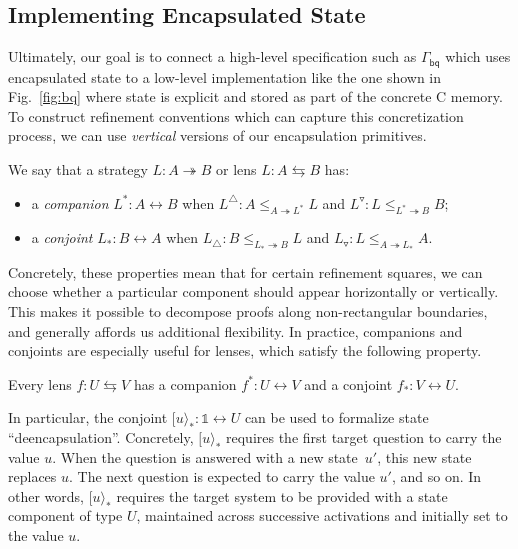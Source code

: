 \documentclass[acmsmall,nonacm]{acmart}
\newcommand{\kw}[1]{\ensuremath{ \mathsf{#1} }}
\newcommand{\lensarrow}{\leftrightarrows}
\newcommand{\mathbbm}[1]{\mathds{#1}}
\begin{document}

\subsection{Implementing Encapsulated State} %

Ultimately, our goal
is to connect a high-level specification such as $\Gamma_\kw{bq}$
which uses encapsulated state
to a low-level implementation like the one shown in Fig.~\ref{fig:bq}
where state is explicit and stored as part of the concrete C memory.
To construct refinement conventions
which can capture this concretization process,
we can use \emph{vertical} versions of our encapsulation primitives.

\begin{definition} %
We say that a strategy $L : A \twoheadrightarrow B$
or lens $L : A \leftrightarrows B$
has:
\begin{itemize}
  \item a \emph{companion} $L^* : A \leftrightarrow B$ when
    $L^\triangle : A \le_{A \twoheadrightarrow L^*} L$
    and
    $L^\triangledown : L \le_{L^* \twoheadrightarrow B} B$;
  \item a \emph{conjoint} $L_* : B \leftrightarrow A$ when
    $L_\triangle : B \le_{L_* \twoheadrightarrow B} L$
    and
    $L_\triangledown : L \le_{A \twoheadrightarrow L_*} A$.
\end{itemize}
\end{definition}

Concretely,
these properties mean that for certain refinement squares,
we can choose
whether a particular component
should appear horizontally or vertically.
This makes it possible to decompose proofs
along non-rectangular boundaries,
and generally affords us additional flexibility.
%
In practice,
companions and conjoints
are especially useful for lenses,
which satisfy the following property.

\begin{theorem}
Every lens $f : U \lensarrow V$
has a companion $f^* : U \leftrightarrow V$
and a conjoint $f_* : V \leftrightarrow U$.
\end{theorem}

In particular,
the conjoint
$[u\rangle_* : \mathbbm{1} \leftrightarrow U$
can be used to formalize state ``deencapsulation''.
Concretely, $[u\rangle_*$ requires the first target question
to carry the value $u$.
When the question is answered with a new state~$u'$,
this new state replaces $u$.
The next question is
expected to carry the value $u'$,
and so on.
In other words,
$[u\rangle_*$
requires the target system to be provided with a state component of type $U$,
maintained across successive activations and
initially set to the value $u$.
\end{document}
